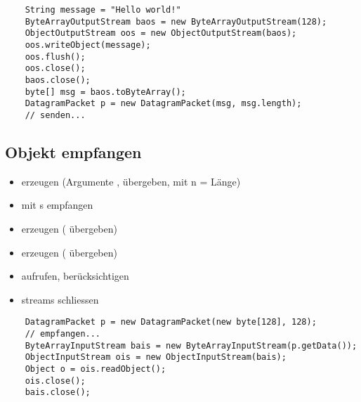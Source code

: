 \begin{verbatim}
    String message = "Hello world!"
    ByteArrayOutputStream baos = new ByteArrayOutputStream(128);
    ObjectOutputStream oos = new ObjectOutputStream(baos);
    oos.writeObject(message);
    oos.flush();
    oos.close();
    baos.close();
    byte[] msg = baos.toByteArray();
    DatagramPacket p = new DatagramPacket(msg, msg.length);
    // senden...
\end{verbatim}

\subsection*{Objekt empfangen}
\begin{itemize}
    \item {}  erzeugen (Argumente ,  übergeben, mit n = Länge)
    \item mit s  empfangen
    \item {}  erzeugen ( übergeben)
    \item {}  erzeugen ( übergeben)
    \item {} aufrufen,  berücksichtigen
    \item streams schliessen
\end{itemize}


\begin{verbatim}
    DatagramPacket p = new DatagramPacket(new byte[128], 128);
    // empfangen...
    ByteArrayInputStream bais = new ByteArrayInputStream(p.getData());
    ObjectInputStream ois = new ObjectInputStream(bais);
    Object o = ois.readObject();
    ois.close();
    bais.close();
\end{verbatim}